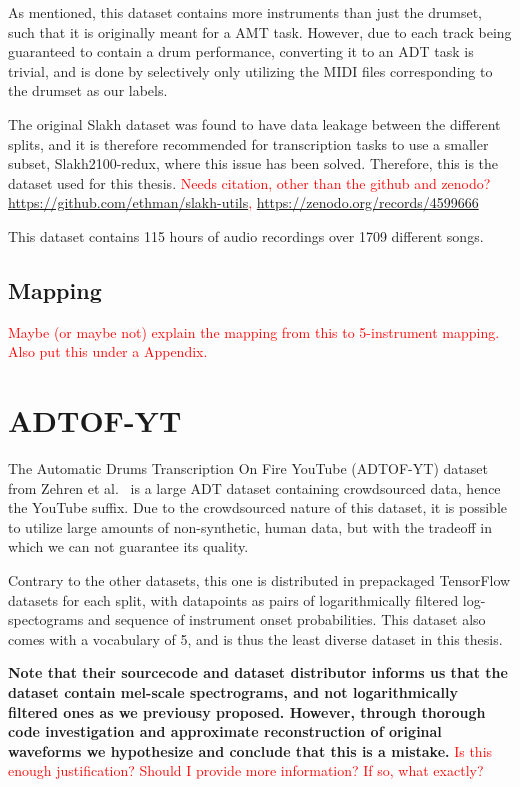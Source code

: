 As mentioned, this dataset contains more instruments than just the drumset, such that it is originally meant for a \gls{AMT} task. However, due to each track being guaranteed to contain a drum performance, converting it to an \gls{ADT} task is trivial, and is done by selectively only utilizing the MIDI files corresponding to the drumset as our labels.

The original Slakh dataset was found to have data leakage between the different splits, and it is therefore recommended for transcription tasks to use a smaller subset, Slakh2100-redux, where this issue has been solved. Therefore, this is the dataset used for this thesis.
\textcolor{red}{Needs citation, other than the github and zenodo? \\ \url{https://github.com/ethman/slakh-utils}, \url{https://zenodo.org/records/4599666}}

This dataset contains 115 hours of audio recordings over 1709 different songs.

\subsection{Mapping}

\textcolor{red}{Maybe (or maybe not) explain the mapping from this to 5-instrument mapping. Also put this under a Appendix.}

\section{ADTOF-YT}

The Automatic Drums Transcription On Fire YouTube (ADTOF-YT) dataset from Zehren et al.~\cite{signals4040042} is a large \gls{ADT} dataset containing crowdsourced data, hence the YouTube suffix. Due to the crowdsourced nature of this dataset, it is possible to utilize large amounts of non-synthetic, human data, but with the tradeoff in which we can not guarantee its quality.

Contrary to the other datasets, this one is distributed in prepackaged TensorFlow datasets for each split, with datapoints as pairs of logarithmically filtered log-spectograms and sequence of instrument onset probabilities. This dataset also comes with a vocabulary of 5, and is thus the least diverse dataset in this thesis.

\textbf{Note that their sourcecode and dataset distributor informs us that the dataset contain mel-scale spectrograms, and not logarithmically filtered ones as we previousy proposed. However, through thorough code investigation and approximate reconstruction of original waveforms we hypothesize and conclude that this is a mistake.}
\textcolor{red}{Is this enough justification? Should I provide more information? If so, what exactly?}


